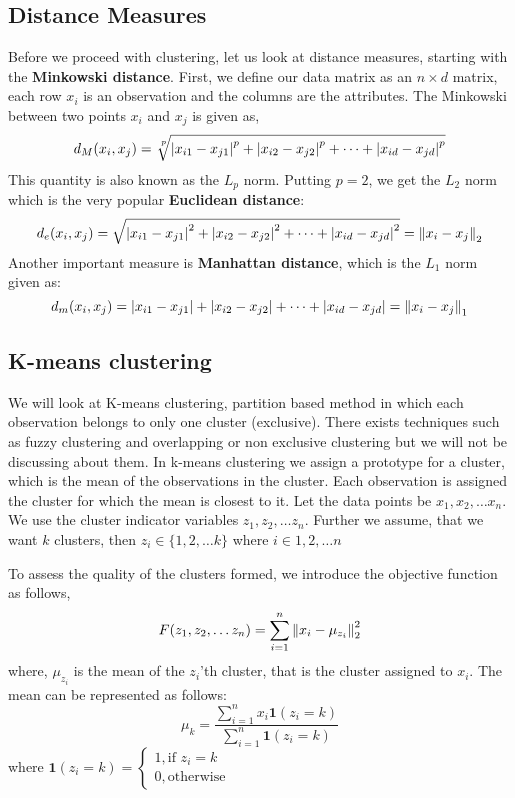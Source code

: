 \documentclass[12pt,a4paper]{article}
\begin{document}
\subsection{Distance Measures}
Before we proceed with clustering, let us look at distance measures, starting with the \textbf{Minkowski distance}. First, we define our data matrix as an $n \times d$ matrix, each row $x_i$ is an observation and the columns are the attributes. 
The Minkowski between two points $x_i$ and $x_j$ is given as,
$$d_{M}(x_i,x_j) = \sqrt[\leftroot{-2}\uproot{3}p]{ \abs{x_{i1}-x_{j1}}^p + \abs{x_{i2}-x_{j2}}^p + \dots + \abs{x_{id}-x_{jd}}^p}$$
This quantity is also known as the $L_p$ norm. Putting $p=2$, we get the $L_2$ norm which is the very popular \textbf{Euclidean distance}:
$$d_{e}(x_i,x_j) = \sqrt{ \abs{x_{i1}-x_{j1}}^2 + \abs{x_{i2}-x_{j2}}^2 + \dots + \abs{x_{id}-x_{jd}}^2} = \norm{x_i - x_j}_{2}$$
Another important measure is \textbf{Manhattan distance}, which is the $L_1$ norm given as:
$$d_{m}(x_i,x_j) = \abs{x_{i1}-x_{j1}} + \abs{x_{i2}-x_{j2}} + \dots + \abs{x_{id}-x_{jd}} = \norm{x_i - x_j}_{1}$$

\subsection{K-means clustering}
We will look at K-means clustering, partition based method in which each observation belongs to only one cluster (exclusive). There exists techniques such as fuzzy clustering and overlapping or non exclusive clustering but we will not be discussing about them.
In k-means clustering we assign a prototype for a cluster, which is the mean of the observations in the cluster. Each observation is assigned the cluster for which the mean is closest to it. Let the data points be $x_1, x_2, \dots x_n$. We use the cluster indicator variables $z_1, z_2, \dots z_n$. Further we assume, that we want $k$ clusters, then $z_i \in \{1,2, \dots k\}$ where $i \in {1,2, \dots n}$

To assess the quality of the clusters formed, we introduce the objective function as follows,
\begin{gather}
    F(z_1,z_2, \dots z_n) = \sum_{i=1}^{n} \norm{x_i - \mu_{z_{i}}}^{2}_{2} \label{obj-kmeans}
\end{gather}
where, $\mu_{z_{i}}$ is the mean of the $z_i$'th cluster, that is the cluster assigned to $x_i$.
The mean can be represented as follows:
$$\mu_k = \dfrac{ \sum_{i=1}^{n} x_i \textbf{1}(z_i=k) }{ \sum_{i=1}^{n}\textbf{1}(z_i=k) }$$
where $\textbf{1}(z_i = k) = \begin{cases} 1, \text{if $z_i=k$}\\ 0, \text{otherwise} \end{cases}$
\end{document}
